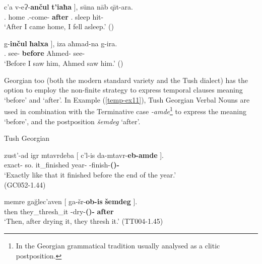 \begin{enumerate}[label=\Roman*.]
\begin{exe}
\begin{xlist}
		
			\ex\label{temp-ex10a}
			\gll {{\normalfont[} so}	c'a	v-eɁ-\textbf{ančul}    {\textbf{t'iaħa} {\normalfont]}},	s\={u}na	n\={a}b	q\={\i}t-ara.	\\
			{\Fsg}.{\Nom}	home	{\M}.{\Sg}-come-\textbf{{\Nmlz}}	\textbf{after}	{\Fsg}.{\Dat}	sleep	hit-{\Pst} \\	
			\trans `After I came home, I fell asleep.’ 
			\hfill (\cite{good})
		
		
		
			\ex\label{temp-ex10b}
			\gll {{\normalfont[} sunna}	g-\textbf{inčul} {\textbf{ħalxa} {\normalfont]}},	iza	aħmad-na	g-ira.  \\
			{\Fsg}.{\Dat}	see-\textbf{{\Nmlz}}	\textbf{before}	{\Tsg}	Ahmed-{\Dat}	see-{\Pst}	\\
			\trans `Before I saw him, Ahmed saw him.’
			\hfill (\cite{good})
		
	\end{xlist}
\end{exe}
\largerpage

Georgian too (both the modern standard variety and the Tush dialect) has the option to employ the non-finite strategy to express temporal clauses meaning `before' and `after'. In Example (\ref{temp-ex11}), Tush Georgian Verbal Nouns are used in combination with the Terminative case \textit{-amde}\footnote{In the Georgian grammatical tradition usually analysed as a clitic postposition.} to express the meaning `before', and the postposition \textit{šemdeg} `after'.

\begin{exe}
	\ex\label{temp-ex11} 
    	Tush Georgian
        \begin{xlist}
	
		
			\ex\label{temp-ex11a}
			\gll zust'-ad	igr	mtavrdeba	{{\normalfont[} c'l-is}	{da-mtavr-\textbf{eb-amde} {\normalfont]}}.   \\
			exact-{\Advb}	so.{\Dist}	it\_finished	year-{\Gen}	{\Pv}-finish-{\Tm}\textbf{({\Vn})-{\Term}}  \\
			\trans `Exactly like that it finished before the end of the year.’ \\
			\hfill (GC052-1.44)
		
		
		
			\ex\label{temp-ex11b}
			\gll memre	ga\u{g}lec'aven	{{\normalfont[} ga-šr-\textbf{ob-is}} {\textbf{šemdeg} {\normalfont]}}. \\
			then	they\_thresh\_it	{\Pv}-dry-{\Tm}\textbf{({\Vn})-{\Gen}}	\textbf{after}   \\	
			\trans `Then, after drying it, they thresh it.’	
			\hfill (TT004-1.45)
		

\end{xlist}
\end{exe}
\end{enumerate}
